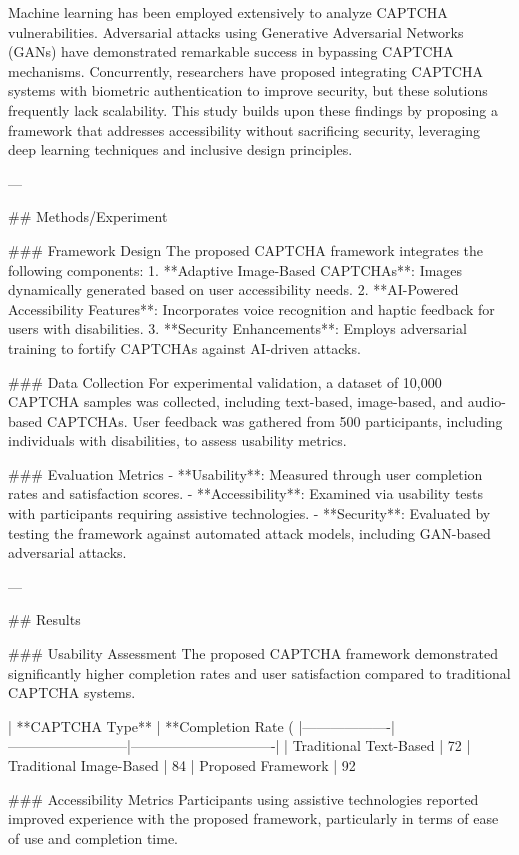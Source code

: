 Machine learning has been employed extensively to analyze CAPTCHA vulnerabilities. Adversarial attacks using Generative Adversarial Networks (GANs) have demonstrated remarkable success in bypassing CAPTCHA mechanisms. Concurrently, researchers have proposed integrating CAPTCHA systems with biometric authentication to improve security, but these solutions frequently lack scalability. This study builds upon these findings by proposing a framework that addresses accessibility without sacrificing security, leveraging deep learning techniques and inclusive design principles.  

---

## Methods/Experiment  

### Framework Design  
The proposed CAPTCHA framework integrates the following components:  
1. **Adaptive Image-Based CAPTCHAs**: Images dynamically generated based on user accessibility needs.  
2. **AI-Powered Accessibility Features**: Incorporates voice recognition and haptic feedback for users with disabilities.  
3. **Security Enhancements**: Employs adversarial training to fortify CAPTCHAs against AI-driven attacks.  

### Data Collection  
For experimental validation, a dataset of 10,000 CAPTCHA samples was collected, including text-based, image-based, and audio-based CAPTCHAs. User feedback was gathered from 500 participants, including individuals with disabilities, to assess usability metrics.  

### Evaluation Metrics  
- **Usability**: Measured through user completion rates and satisfaction scores.  
- **Accessibility**: Examined via usability tests with participants requiring assistive technologies.  
- **Security**: Evaluated by testing the framework against automated attack models, including GAN-based adversarial attacks.  

---

## Results  

### Usability Assessment  
The proposed CAPTCHA framework demonstrated significantly higher completion rates and user satisfaction compared to traditional CAPTCHA systems.

| **CAPTCHA Type** | **Completion Rate (%
|-------------------|--------------------------|-------------------------------|  
| Traditional Text-Based | 72%
| Traditional Image-Based | 84%
| Proposed Framework | 92%

### Accessibility Metrics  
Participants using assistive technologies reported improved experience with the proposed framework, particularly in terms of ease of use and completion time.

